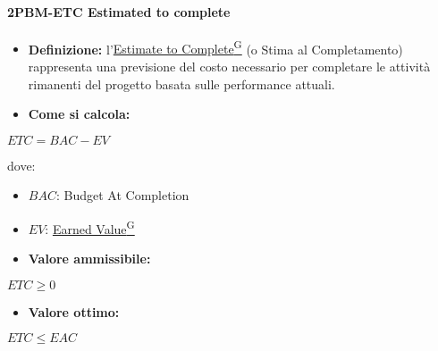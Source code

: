 \paragraph*{2PBM-ETC Estimated to complete}
\begin{itemize}
    \item \textbf{Definizione:} l’\href{https://code7crusaders.github.io/docs/RTB/documentazione_interna/glossario.html#estimate-to-complete}{Estimate to Complete\textsuperscript{G}} (o Stima al Completamento) rappresenta una previsione del costo necessario per completare le attività rimanenti del progetto basata sulle performance attuali.
    \item \textbf{Come si calcola:}
\end{itemize}
\begin{center}
   $ETC = BAC - EV$ 
\end{center}
dove:
\begin{itemize}[label=$\rightarrow$]
    \item $BAC$: Budget At Completion
    \item $EV$: \href{https://code7crusaders.github.io/docs/RTB/documentazione_interna/glossario.html#earned-value}{Earned Value\textsuperscript{G}}
\end{itemize}
\begin{itemize}
    \item \textbf{Valore ammissibile:}
\end{itemize}
\begin{center}
    $ETC \geq 0$
\end{center}
\begin{itemize}
    \item \textbf{Valore ottimo:}
\end{itemize}
\begin{center}
    $ETC \leq EAC$
\end{center}

